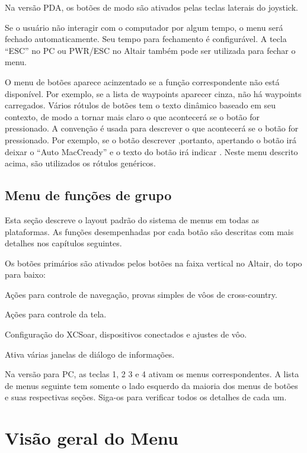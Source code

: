 Na versão PDA, os botões de modo são ativados pelas teclas laterais do joystick.

Se o usuário não interagir com o computador por algum tempo, o menu será fechado automaticamente.  Seu tempo para fechamento é configurável.  A tecla “ESC” no PC ou PWR/ESC no Altair também pode ser utilizada para fechar o menu.

O menu de botões aparece acinzentado se a função correspondente não está disponível.  Por exemplo, se a lista de waypoints aparecer cinza, não há waypoints carregados.
Vários rótulos de botões tem o texto dinâmico baseado em seu contexto, de modo a tornar mais claro o que acontecerá se o botão for pressionado.  A convenção é usada para descrever o que acontecerá se o botão for pressionado. Por exemplo, se o botão descrever ,portanto, apertando o botão irá deixar o “Auto MacCready” e o texto do botão irá indicar . 
Neste menu descrito acima, são utilizados os rótulos genéricos. 

\subsection*{Menu de funções de grupo}
Esta seção descreve o layout padrão do sistema de menus em todas as plataformas.  As funções desempenhadas por cada botão são descritas com mais detalhes nos capítulos seguintes.

Os botões primários são ativados pelos botões na faixa vertical no Altair, do topo para baixo:

\begin{jspecs}
\item[\bmenug{Nav}] Ações para controle de navegação, provas simples de vôos de cross-country.
\item[\bmenug{Mostrar}]Ações para controle da tela.
\item[\bmenug{Config}] Configuração do XCSoar, dispositivos conectados e ajustes de vôo.
\item[\bmenug{Info}] Ativa várias janelas de diálogo de informações.
\end{jspecs}

Na versão para PC, as teclas 1, 2 3 e 4 ativam os menus correspondentes.  A lista de menus seguinte tem somente o lado esquerdo da maioria dos menus de botões e suas respectivas seções.  Siga-os para verificar todos os detalhes de cada um.

\section{Visão geral do Menu}

